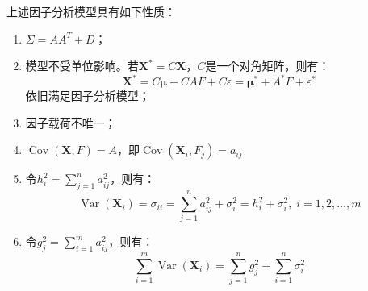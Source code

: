 \begin{property}\label{prop:FactorAnalysis}
	上述因子分析模型具有如下性质：
	\begin{enumerate}
		\item $\Sigma=AA^T+D$；
		\item 模型不受单位影响。若$\mathbf{X}^*=C\mathbf{X}$，$C$是一个对角矩阵，则有：
		\begin{equation*}
			\mathbf{X}^*=C\boldsymbol{\mu}+CAF+C\varepsilon=\boldsymbol{\mu}^*+A^*F+\varepsilon^*
		\end{equation*}
		依旧满足因子分析模型；
		\item 因子载荷不唯一；
		\item $\operatorname{Cov}(\mathbf{X},F)=A$，即$\operatorname{Cov}(\mathbf{X}_i,F_j)=a_{ij}$
		\item 令$h_i^2=\sum\limits_{j=1}^{n}a_{ij}^2$，则有：
		\begin{equation*}
			\operatorname{Var}(\mathbf{X}_i)=\sigma_{ii}=\sum_{j=1}^{n}a_{ij}^2+\sigma_i^2=h_i^2+\sigma_i^2,\;i=1,2,\dots,m
		\end{equation*}
		\item 令$g_j^2=\sum\limits_{i=1}^{m}a_{ij}^2$，则有：
		\begin{equation*}
			\sum_{i=1}^{m}\operatorname{Var}(\mathbf{X}_i)=\sum_{j=1}^{n}g_j^2+\sum_{i=1}^{n}\sigma_i^2
		\end{equation*}
	\end{enumerate}
\end{property}
